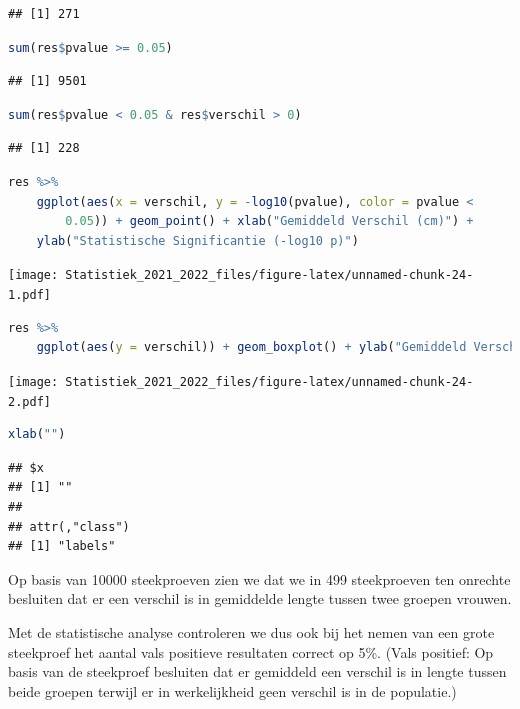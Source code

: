 \documentclass[
  12pt,dutch,coursenotes]{book}
\theoremstyle{definition}
\theoremstyle{definition}
\theoremstyle{definition}
\theoremstyle{definition}
\theoremstyle{remark}
\begin{document}
\begin{lstlisting}
## [1] 271
\end{lstlisting}

\begin{lstlisting}[language=R]
sum(res$pvalue >= 0.05)
\end{lstlisting}

\begin{lstlisting}
## [1] 9501
\end{lstlisting}

\begin{lstlisting}[language=R]
sum(res$pvalue < 0.05 & res$verschil > 0)
\end{lstlisting}

\begin{lstlisting}
## [1] 228
\end{lstlisting}

\begin{lstlisting}[language=R]
res %>%
    ggplot(aes(x = verschil, y = -log10(pvalue), color = pvalue <
        0.05)) + geom_point() + xlab("Gemiddeld Verschil (cm)") +
    ylab("Statistische Significantie (-log10 p)")
\end{lstlisting}

\texttt{[image: Statistiek\_2021\_2022\_files/figure-latex/unnamed-chunk-24-1.pdf]}

\begin{lstlisting}[language=R]
res %>%
    ggplot(aes(y = verschil)) + geom_boxplot() + ylab("Gemiddeld Verschil (cm)")
\end{lstlisting}

\texttt{[image: Statistiek\_2021\_2022\_files/figure-latex/unnamed-chunk-24-2.pdf]}

\begin{lstlisting}[language=R]
xlab("")
\end{lstlisting}

\begin{lstlisting}
## $x
## [1] ""
## 
## attr(,"class")
## [1] "labels"
\end{lstlisting}

Op basis van 10000 steekproeven zien we dat we in 499 steekproeven ten onrechte besluiten dat er een verschil is in gemiddelde lengte tussen twee groepen vrouwen.

Met de statistische analyse controleren we dus ook bij het nemen van een grote steekproef het aantal vals positieve resultaten correct op 5\%. (Vals positief: Op basis van de steekproef besluiten dat er gemiddeld een verschil is in lengte tussen beide groepen terwijl er in werkelijkheid geen verschil is in de populatie.)
\end{document}
